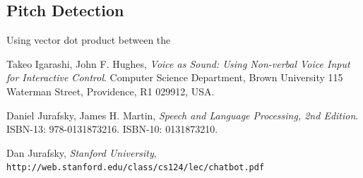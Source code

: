 \documentclass[
	article,			%
	11pt,				%
	oneside,			%
	a4paper,			%
	english,			%
	english,				%
	]{abntex2}
\begin{document}
\subsection{Pitch Detection}

Using vector dot product between the



\medskip

\begin{thebibliography}{9}

Takeo Igarashi, John F. Hughes, 
\textit{Voice as Sound: Using Non-verbal Voice Input for Interactive Control}. 
Computer Science Department, Brown University 115 Waterman Street, Providence, R1 029912, USA.
 
Daniel Jurafsky, James H. Martin, 
\textit{Speech and Language Processing, 2nd Edition}.
ISBN-13: 978-0131873216.
ISBN-10: 0131873210.
 
Dan	Jurafsky, 
\textit{Stanford	University}, 
\\\texttt{http://web.stanford.edu/class/cs124/lec/chatbot.pdf}

\end{thebibliography}
 
\end{document}
